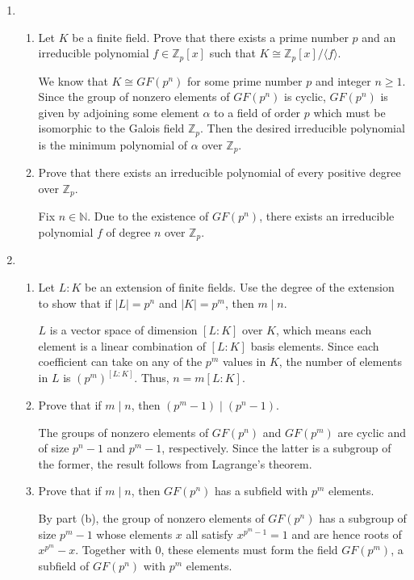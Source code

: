 \documentclass[12pt]{article}
\newcommand{\ZZ}{\mathbb{Z}}
\begin{document}
\begin{enumerate}
    \item
    \begin{enumerate}
        \item Let $K$ be a finite field.  Prove that there exists a prime number $p$ and an irreducible polynomial $f \in \ZZ_p[x]$ such that $K \cong \ZZ_p[x]/\langle f \rangle$.  \par
            We know that $K \cong GF(p^n)$ for some prime number $p$ and integer $n \geq 1$. Since the group of nonzero elements of $GF(p^n)$ is cyclic, $GF(p^n)$ is given by adjoining some element $\alpha$ to a field of order $p$ which must be isomorphic to the Galois field $\ZZ_p$. Then the desired irreducible polynomial is the minimum polynomial of $\alpha$ over $\ZZ_p$.
        \item Prove that there exists an irreducible polynomial of every positive degree over $\ZZ_p$. \par
            Fix $n \in \mathbb{N}$. Due to the existence of $GF(p^n)$, there exists an irreducible polynomial $f$ of degree $n$ over $\mathbb{Z}_p$.
    \end{enumerate}

    \item 
    \begin{enumerate}
        \item Let $L:K$ be an extension of finite fields.  Use the degree of the extension to show that if $|L| = p^n$ and $|K|=p^m$, then $m \mid n$. \par
            $L$ is a vector space of dimension $[L : K]$ over $K$, which means each element is a linear combination of $[L : K]$ basis elements. Since each coefficient can take on any of the $p^m$ values in $K$, the number of elements in $L$ is $\left( p^m \right)^{[L : K]}$. Thus, $n = m[L : K]$. %
        \item Prove that if $m \mid n$, then $(p^m-1) \mid (p^n-1)$. \par
            The groups of nonzero elements of $GF(p^n)$ and $GF(p^m)$ are cyclic and of size $p^n - 1$ and $p^m - 1$, respectively. Since the latter is a subgroup of the former, the result follows from Lagrange's theorem.
        \item Prove that if $m \mid n$, then $GF(p^n)$ has a subfield with $p^m$ elements. \par
            By part (b), the group of nonzero elements of $GF(p^n)$ has a subgroup of size $p^m - 1$ whose elements $x$ all satisfy $x^{p^m - 1} = 1$ and are hence roots of $x^{p^m} - x$. Together with $0$, these elements must form the field $GF(p^m)$, a subfield of $GF(p^n)$ with $p^m$ elements.
    \end{enumerate}


\end{enumerate}
\end{document}
